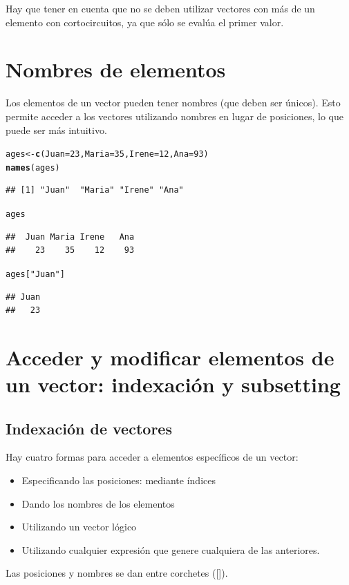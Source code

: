 \documentclass{config/apuntes}\usepackage[]{graphicx}\usepackage[]{xcolor}
\makeatletter
\newcommand{\hlnum}[1]{\textcolor[rgb]{0.686,0.059,0.569}{#1}}%
\newcommand{\hlsng}[1]{\textcolor[rgb]{0.192,0.494,0.8}{#1}}%
\newcommand{\hldef}[1]{\textcolor[rgb]{0.345,0.345,0.345}{#1}}%
\newcommand{\hlkwb}[1]{\textcolor[rgb]{0.69,0.353,0.396}{#1}}%
\newcommand{\hlkwc}[1]{\textcolor[rgb]{0.333,0.667,0.333}{#1}}%
\newcommand{\hlkwd}[1]{\textcolor[rgb]{0.737,0.353,0.396}{\textbf{#1}}}%
\newenvironment{kframe}{%
 \def\at@end@of@kframe{}%
 \ifinner\ifhmode%
  \def\at@end@of@kframe{\end{minipage}}%
  \begin{minipage}{\columnwidth}%
 \fi\fi%
 \def\FrameCommand##1{\hskip\@totalleftmargin \hskip-\fboxsep
 \colorbox{shadecolor}{##1}\hskip-\fboxsep
     \hskip-\linewidth \hskip-\@totalleftmargin \hskip\columnwidth}%
 \MakeFramed {\advance\hsize-\width
   \@totalleftmargin\z@ \linewidth\hsize
   \@setminipage}}%
 {\par\unskip\endMakeFramed%
 \at@end@of@kframe}
\newenvironment{knitrout}{}{} %
\makeatother
\begin{document}
Hay que tener en cuenta que no se deben utilizar vectores con más de un elemento con cortocircuitos, ya que sólo se evalúa el primer valor. 

\section{Nombres de elementos}
Los elementos de un vector pueden tener nombres (que deben ser únicos). Esto permite acceder a los vectores utilizando nombres en lugar de posiciones, lo que puede ser más intuitivo. 

\begin{knitrout}
\color{fgcolor}\begin{kframe}
\begin{alltt}
\hldef{ages} \hlkwb{<-} \hlkwd{c}\hldef{(}\hlkwc{Juan} \hldef{=} \hlnum{23}\hldef{,} \hlkwc{Maria} \hldef{=} \hlnum{35}\hldef{,} \hlkwc{Irene} \hldef{=} \hlnum{12}\hldef{,} \hlkwc{Ana} \hldef{=} \hlnum{93}\hldef{)}
\hlkwd{names}\hldef{(ages)}
\end{alltt}
\begin{verbatim}
## [1] "Juan"  "Maria" "Irene" "Ana"
\end{verbatim}
\begin{alltt}
\hldef{ages}
\end{alltt}
\begin{verbatim}
##  Juan Maria Irene   Ana 
##    23    35    12    93
\end{verbatim}
\begin{alltt}
\hldef{ages[}\hlsng{"Juan"}\hldef{]}
\end{alltt}
\begin{verbatim}
## Juan 
##   23
\end{verbatim}
\end{kframe}
\end{knitrout}

\section{Acceder y modificar elementos de un vector: indexación y subsetting}
\subsection{Indexación de vectores}
Hay cuatro formas para acceder a elementos específicos de un vector:
\begin{itemize}
\item Especificando las posiciones: mediante índices
\item Dando los nombres de los elementos
\item Utilizando un vector lógico
\item Utilizando cualquier expresión que genere cualquiera de las anteriores.
\end{itemize}
Las posiciones y nombres se dan entre corchetes ([]).
\end{document}
